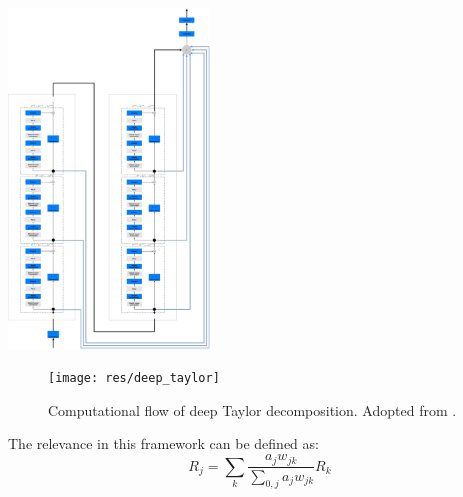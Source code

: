 \documentclass[a4paper,9pt]{beamer}
\theoremstyle{mytheoremstyle}
\begin{document}
\begin{frame}
\begin{center}
\includegraphics[width=0.4\textwidth]{res/network_architecture}
\end{center}
\end{frame}


\begin{frame}
\begin{figure}
\begin{center}
  \texttt{[image: res/deep\_taylor]}
\end{center}
	\caption{Computational flow of deep Taylor decomposition. Adopted from \parencite{montavon2017}.}
\end{figure}
\begin{block}{}
The relevance in this framework can be defined as:
\begin{equation}
R_j = \sum _k \frac{a_j w_{jk}}{\sum _{0,j} a_j w_{jk}} R_k
\end{equation}
\end{block}
\nocite{gibbon1976, mobius1993, mobius2000, mobius1995}
\end{frame}
\end{document}
